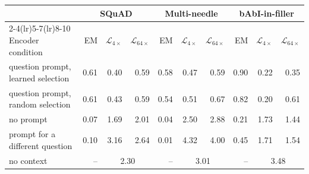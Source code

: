 \begin{tabular}{lrrrrrrrrr}
\toprule
 & \multicolumn{3}{c}{SQuAD} & \multicolumn{3}{c}{Multi-needle} & \multicolumn{3}{c}{bAbI-in-filler} \\
\cmidrule(lr){2-4}\cmidrule(lr){5-7}\cmidrule(lr){8-10}
Encoder condition & EM & $\mathcal{L}_{4\times}$ & $\mathcal{L}_{64\times}$ & EM & $\mathcal{L}_{4\times}$ & $\mathcal{L}_{64\times}$ & EM & $\mathcal{L}_{4\times}$ & $\mathcal{L}_{64\times}$ \\
\midrule
question prompt, learned selection & 0.61 & 0.40 & 0.59 & 0.58 & 0.47 & 0.59 & 0.90 & 0.22 & 0.35 \\
question prompt, random selection & 0.61 & 0.43 & 0.59 & 0.54 & 0.51 & 0.67 & 0.82 & 0.20 & 0.61 \\
no prompt & 0.07 & 1.69 & 2.01 & 0.04 & 2.50 & 2.88 & 0.21 & 1.73 & 1.44 \\
prompt for a different question & 0.10 & 3.16 & 2.64 & 0.01 & 4.32 & 4.00 & 0.45 & 1.71 & 1.54 \\
\midrule
no context & -- & \multicolumn{2}{c}{2.30} & -- & \multicolumn{2}{c}{3.01} & -- & \multicolumn{2}{c}{3.48} \\
\bottomrule
\end{tabular}
